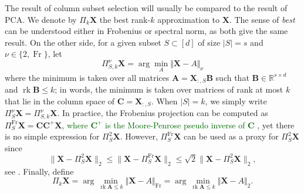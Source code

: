 \documentclass[twoside,11pt]{book}
\newcommand{\rev}[1]{\textcolor{darkgreen}{#1}}
\numberwithin{theorem}{chapter}
\numberwithin{definition}{chapter}
\numberwithin{proposition}{chapter}
\numberwithin{corollary}{chapter}
\numberwithin{example}{chapter}
\numberwithin{lemma}{chapter}
\numberwithin{assumption}{chapter}
\DeclareMathOperator{\rank}{\mathrm{rk}}
\DeclareMathOperator{\Fr}{\mathrm{Fr}}
\begin{document}
The result of column subset selection will usually be compared to the result of PCA. We denote by $\Pi_k\bm{X}$ the best rank-$k$ approximation to $\bm{X}$. The sense of \emph{best} can be understood either in Frobenius or spectral norm, as both give the same result. On the other side, for a given subset $S \subset [d]$ of size $\vert S\vert=s$ and $\nu\in\{2,\Fr\}$, let
$$\Pi_{S,k}^{\nu}\bm{X} = \arg\min_{A} \Vert \bm{X}- A\Vert_{\nu}$$
where the minimum is taken over all matrices $\bm{A} = \bm{X}_{:,S}\bm{B}$ such that $\bm{B}\in\mathbb{R}^{s\times d}$ and $\rank \bm{B}\leq k$; in words, the minimum is taken over matrices of rank at most $k$ that lie in the column space of $\bm{C}=\bm{X}_{:,S}$. When $|S| = k$, we simply write $\Pi_{S}^{\nu}\bm{X} = \Pi_{S,k}^{\nu}\bm{X}$. In practice, the Frobenius projection can be computed as $\Pi_{S}^{\Fr}\bm{X} = \bm{C}\bm{C}^{+}\bm{X}$, \rev{where $\bm{C}^{+}$ is the Moore-Penrose pseudo inverse of $\bm{C}$} , yet there is no simple expression for $\Pi_{S}^{2}\bm{X}$. However, $\Pi_{S}^{\Fr}\bm{X}$ can be used as a proxy for $\Pi_{S}^{2}\bm{X}$ since
\begin{equation}\label{eq:frob_as_estimator_of_spe}
\|\bm{X} - \Pi_{S}^{2}\bm{X}\|_{2} \leq \|\bm{X} - \Pi_{S}^{\Fr}\bm{X}\|_{2}  \leq \sqrt{2} \|\bm{X} - \Pi_{S}^{2}\bm{X}\|_{2},
\end{equation}
see \cite[Lemma 2.3]{BoDrMI11}.
Finally, define
$$\Pi_{k}\bm{X} = \arg\min_{\rank \bm{A}\leq k} \Vert \bm{X}- A\Vert_{\Fr} = \arg\min_{\rank \bm{A}\leq k} \Vert \bm{X}- A\Vert_{2}.$$
\end{document}

